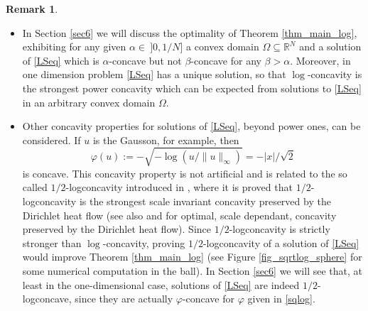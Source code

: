 \documentclass[12pt]{amsart}
\numberwithin{equation}{section}
\theoremstyle{plain}
\theoremstyle{plain}
\theoremstyle{plain}
\theoremstyle{definition}
\newtheorem{remark}[theorem]{Remark}
\newcommand{\R}{{\mathbb R}}
\newcommand{\beq}{\begin{equation}}
\newcommand{\eeq}{\end{equation}}
\begin{document}
\begin{remark}
\begin{itemize}[leftmargin=*]
\[
u(x)=e^{\frac{N}{2}}\, e^{-\frac{|x|^2}{2}}.
\]
Clearly the Gausson is $\log$-concave on $\R^N$.
\item
In Section \ref{sec6} we will discuss the optimality of Theorem \ref{thm_main_log}, exhibiting for any given $\alpha\in \ ]0, 1/N]$ a convex domain $\Omega\subseteq \R^N$ and a solution of \eqref{LSeq} which is $\alpha$-concave but not $\beta$-concave for any $\beta>\alpha$. 
Moreover, in one dimension problem \eqref{LSeq} has a unique solution, so that $\log$-concavity is the strongest power concavity which can be expected from solutions to \eqref{LSeq} in an arbitrary convex domain $\Omega$. 
\item
Other concavity properties for solutions of \eqref{LSeq}, beyond power ones, can be considered. If $u$ is the Gausson, for example, then
\beq
\label{sqlog}
\varphi(u):=-\sqrt{-\log (u/\|u\|_\infty)}=-|x|/\sqrt{2}
\eeq
is concave. This concavity property is not artificial and is related to the so called $1/2$-logconcavity introduced in \cite{IST20}, where it is proved that $1/2$-logconcavity is the strongest scale invariant concavity preserved by the Dirichlet heat flow (see also \cite[Section 4.2]{IST22} and \cite{IST24} for optimal, scale dependant, concavity preserved by the Dirichlet heat flow). 
Since $1/2$-logconcavity is strictly stronger than $\log$-concavity, proving $1/2$-logconcavity of a solution of \eqref{LSeq} would improve Theorem \ref{thm_main_log} (see Figure \ref{fig_sqrtlog_sphere} for some numerical computation in the ball). 
In Section \ref{sec6} we will see that, at least in the one-dimensional case, solutions of \eqref{LSeq} are indeed $1/2$-logconcave, since they are actually $\varphi$-concave for $\varphi$ given in \eqref{sqlog}.
\end{itemize}
\end{remark}
 
\end{document}
